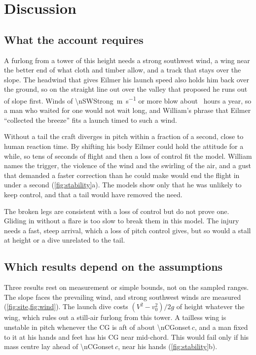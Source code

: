 \section{Discussion}
\label{sec:discussion}

\subsection{What the account requires}

A furlong from a tower of this height needs a strong southwest wind, a wing near the better
end of what cloth and timber allow, and a track that stays over the slope.
The headwind that gives Eilmer his launch speed also holds him back over the ground, so on
the straight line out over the valley that \textcite{woosnam1986eilmer} proposed he runs out
of slope first.
Winds of \SI{\nSWStrong}{\meter\per\second} or more blow about \nSWEightHours\ hours a year, so a man
who waited for one would not wait long, and William's phrase that Eilmer
``collected the breeze'' fits a launch timed to such a wind.

Without a tail the craft diverges in pitch within a fraction of a second, close to human
reaction time.
By shifting his body Eilmer could hold the attitude for a while, so tens of seconds of flight
and then a loss of control fit the model.
William names the trigger, the violence of the wind and the swirling of the air, and a gust
that demanded a faster correction than he could make would end the flight in under a second
(\cref{fig:stability}a).
The models show only that he was unlikely to keep control, and that a tail would have
removed the need.

The broken legs are consistent with a loss of control but do not prove one.
Gliding in without a flare is too slow to break them in this model.
The injury needs a fast, steep arrival, which a loss of pitch control gives, but so would a
stall at height or a dive unrelated to the tail.

\subsection{Which results depend on the assumptions}

Three results rest on measurement or simple bounds, not on the sampled ranges.
The slope faces the prevailing wind, and strong southwest winds are measured
(\cref{fig:site,fig:wind}).
The launch dive costs \((V^2-v_0^2)/2g\) of height whatever the wing, which rules out a
still-air furlong from this tower.
A tailless wing is unstable in pitch whenever the CG is aft of about \num{\nCGonset}\,\(c\),
and a man fixed to it at his hands and feet has his CG near mid-chord.
This would fail only if his mass centre lay ahead of \num{\nCGonset}\,\(c\), near his hands
(\cref{fig:stability}b).

